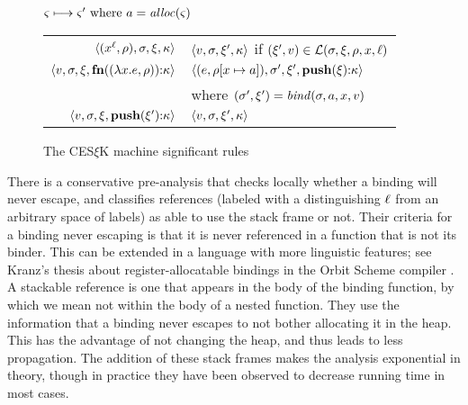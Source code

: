 \begin{figure}
  \centering
  $\mstate \stepto \mstate' \text{ where } \maddr = \alloc(\mstate)$ \\
  \begin{tabular}{r|l}
    \hline
    $\tpl{(\svar[\mlab]{\mvar}, \menv), \mstore, \mframe, \mkont}$
    &
    $\tpl{\mval,\mstore,\mframe',\mkont}$ if $(\mframe', \mval) \in \lookup(\mstore,\mframe,\menv,\mvar,\mlab)$
    \\
    $\tpl{\mval,\mstore,\mframe,\kcons{\kfn{\vclo{\slam{\mvar}{\mexpr}}{\menv}}}{\mkont}}$
    &
    $\tpl{(\mexpr, \extm{\menv}{\mvar}{\maddr}), \mstore', \mframe', \kcons{\kpush{\mframe}}{\mkont}}$
    \\ & where $(\mstore',\mframe') = \bind(\mstore,\maddr,\mvar,\mval)$
    \\
    $\tpl{\mval,\mstore,\mframe,\kcons{\kpush{\mframe'}}{\mkont}}$
    &
    $\tpl{\mval,\mstore,\mframe',\mkont}$
  \end{tabular}
  \caption{The CES$\xi$K machine significant rules}
  \label{fig:frame-semantics}
\end{figure}

%
There is a conservative pre-analysis that checks locally whether a binding will never escape, and classifies references (labeled with a distinguishing $\mlab$ from an arbitrary space of labels) as able to use the stack frame or not.
%
Their criteria for a binding never escaping is that it is never referenced in a function that is not its binder.
%
This can be extended in a language with more linguistic features; see Kranz's thesis about register-allocatable bindings in the Orbit Scheme compiler \citep{ianjohnson:kranz:thesis:1988}.
%
A stackable reference is one that appears in the body of the binding function, by which we mean not within the body of a nested function.
%
They use the information that a binding never escapes to not bother allocating it in the heap.
%
This has the advantage of not changing the heap, and thus leads to less propagation.
%
The addition of these stack frames makes the analysis exponential in theory, though in practice they have been observed to decrease running time in most cases.

